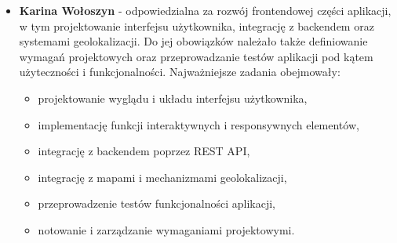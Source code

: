 \begin{itemize}
  \item \textbf{Karina Wołoszyn} - odpowiedzialna za rozwój frontendowej części aplikacji, w tym projektowanie interfejsu użytkownika, integrację z backendem oraz systemami geolokalizacji. Do jej obowiązków należało także definiowanie wymagań projektowych oraz przeprowadzanie testów aplikacji pod kątem użyteczności i funkcjonalności.
        Najważniejsze zadania obejmowały:
        \begin{itemize}
          \item projektowanie wyglądu i układu interfejsu użytkownika,
          \item implementację funkcji interaktywnych i responsywnych elementów,
          \item integrację z backendem poprzez REST API,
          \item integrację z mapami i mechanizmami geolokalizacji,
          \item przeprowadzenie testów funkcjonalności aplikacji,
          \item notowanie i zarządzanie wymaganiami projektowymi.
        \end{itemize}
\end{itemize}
